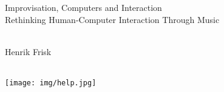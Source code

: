 \begin{titlepage}
  \begin{center}
    {\huge {}Improvisation, Computers and Interaction}\\
{\large {}Rethinking Human-Computer Interaction Through Music}
\\[0.4cm]
\HRule
\\[0.4cm]
\begin{minipage}{\textwidth}
\begin{center}
Henrik Frisk
\end{center}
\end{minipage}
\\[1.7cm] 
\texttt{[image: img/help.jpg]}

\end{center}
\end{titlepage}


